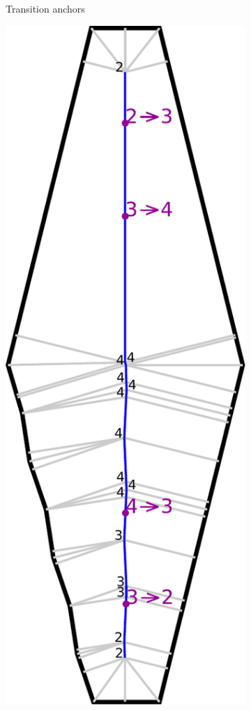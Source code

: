 \begin{figure}
\begin{subfigure}{\figwidth}
\caption{Transition anchors}\label{beading_transitioning_filtering__transition_mids}
\end{subfigure}
\begin{subfigure}{\figwidth}
\includegraphics[width=\columnwidth]{sources-method-beading-transitioning-filtering--filtered.pdf}

\end{subfigure}
\end{figure}
